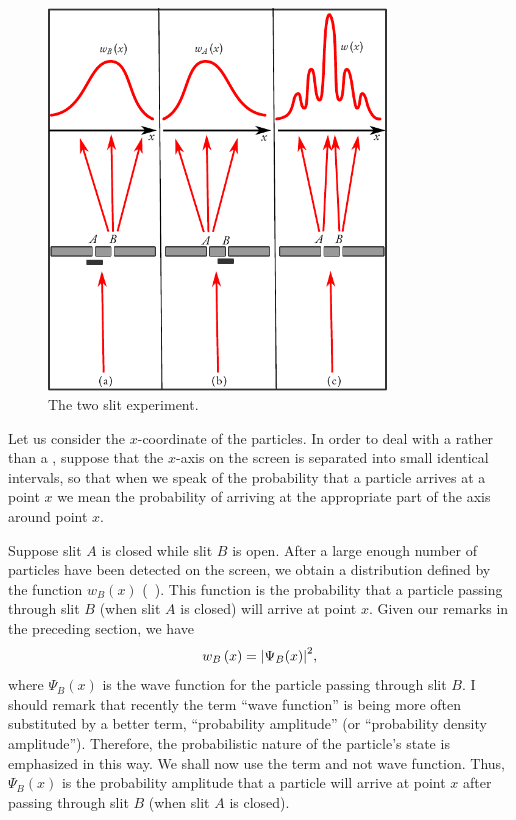 \begin{figure}[!ht]
\centering
\includegraphics[width=0.8\textwidth]{figures/interference.pdf}
\caption{The two slit experiment.\label{double-slit}}
\end{figure}
Let us consider the $x$-coordinate of the particles. In order to deal with a  rather than a , suppose that the $x$-axis on the screen is separated into small identical intervals, so that when we speak of the probability that a particle arrives at a point $x$ we mean the probability of arriving at the appropriate part of the axis around point $x$.

Suppose slit $A$ is closed while slit $B$ is open. After a large enough
number of particles have been detected on the screen, we obtain
a distribution defined by the function $w_{B} (x)$ (~). This function is the probability that a particle passing through slit $B$ (when slit $A$ is closed) will arrive at point $x$. Given our remarks in the preceding section, we have
\begin{equation}%
w_{B} \, (x) = \abs{\Psi_{B} (x)}^{2},
\label{eq-5.5}
\end{equation}
where $\Psi_{B}(x)$ is the wave function for the particle passing through slit $B$. I should remark that recently the term ``wave function'' is being more
often substituted by a better term, ``probability amplitude'' (or ``probability density amplitude''). Therefore, the probabilistic nature of
the particle's state is emphasized in this way. We shall now use the term
 and not wave function. Thus,  $\Psi_{B}(x)$ is the probability amplitude that a particle will arrive at point $x$ after passing
through slit $B$ (when slit $A$ is closed).

